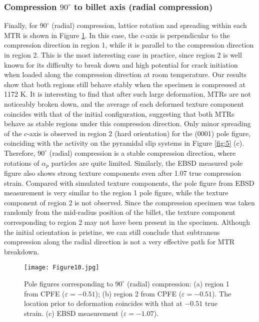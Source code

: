 \documentclass[review]{elsarticle}
\begin{document}
		\subsubsection{Compression \texorpdfstring{$90^{\circ}$}{TEXT} to billet axis (radial compression)}
		Finally, for $90^{\circ}$ (radial) compression, lattice rotation and spreading within each MTR is shown in Figure \ref{fig:9}.
		In this case, the $c$-axis is perpendicular to the compression direction in region 1, while it is parallel to the compression direction in region 2.
		This is the most interesting case in practice, since region 2 is well known for its difficulty to break down and high potential for crack initiation when loaded along the compression direction at room temperature.
		Our results show that both regions still behave stably when the specimen is compressed at 1172 K.
		It is interesting to find that after such large deformation, MTRs are not noticeably broken down, and the average of each deformed texture component coincides with that of the initial configuration, suggesting that both MTRs behave as stable regions under this compression direction.
		Only minor spreading of the $c$-axis is observed in region 2 (hard orientation) for the (0001) pole figure, coinciding with the activity on the pyramidal slip systems in Figure \ref{fig:5} (c).
		Therefore, $90^{\circ}$ (radial) compression is a stable compression direction, where rotations of $\alpha_p$ particles are quite limited.
		Similarly, the EBSD measured pole figure also shows strong texture components even after 1.07 true compression strain.
		Compared with simulated texture components, the pole figure from EBSD measurement is very similar to the region 1 pole figure, while the texture component of region 2 is not observed.
		Since the compression specimen was taken randomly from the mid-radius position of the billet, the texture component corresponding to region 2 may not have been present in the specimen.
		Although the initial orientation is pristine, we can still conclude that subtransus compression along the radial direction is not a very effective path for MTR breakdown.
		\begin{figure}[!htb]
		\centering
		\texttt{[image: Figure10.jpg]}
		\caption{\label{fig:9}Pole figures corresponding to $90^{\circ}$ (radial) compression: (a) region 1 from CPFE ($\varepsilon =-0.51$); (b) region 2 from CPFE ($\varepsilon =-0.51$). The location prior to deformation coincides with that at $-0.51$ true strain. (c) EBSD measurement ($\varepsilon =-1.07$).}
		\end{figure}
            
\end{document}
